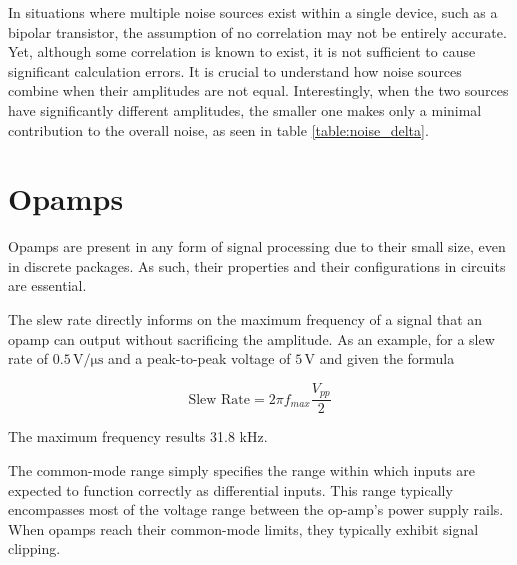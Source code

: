 In situations where multiple noise sources exist within a single device, such
as a bipolar transistor, the assumption of no correlation may not be entirely
accurate.
Yet, although some correlation is known to exist, it is not sufficient to cause
significant calculation errors. It is crucial to understand how noise sources
combine when their amplitudes are not equal. Interestingly, when the two
sources have significantly different amplitudes, the smaller one makes only a
minimal contribution to the overall noise, as seen in table
\ref{table:noise_delta}.


\section{Opamps}

Opamps are present in any form of signal processing due to their small
size, even in discrete packages. As such, their properties and their
configurations in circuits are essential.

The slew rate directly informs on the maximum frequency of a signal that
an opamp can output without sacrificing the amplitude. As an example, for a
slew rate of \( 0.5 \, \text{V/μs} \) and a peak-to-peak voltage of
\( 5 \, \text{V} \) and given the formula

\begin{equation}\label{eq:slewrate}
    \text{Slew Rate} = 2\pi f_{max} \frac{V_{pp}}{2}
\end{equation}

The maximum frequency results 31.8 kHz.

The common-mode range simply specifies the range within which inputs are
expected to function correctly as differential inputs.
This range typically encompasses most of the voltage range between the op-amp's
power supply rails.
When opamps reach their common-mode limits, they typically exhibit signal
clipping.

